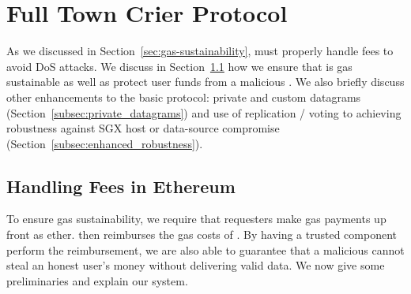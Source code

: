 \section{Full Town Crier Protocol}
\label{sec:enhanced_protocol}

As we discussed in Section~\ref{sec:gas-sustainability}, \tc must properly handle fees to avoid DoS attacks.
We discuss in Section~\ref{sec:gas-protocol} how we ensure that \tc is gas sustainable as well as protect user funds from a malicious \tc.
We also briefly discuss other enhancements to the basic \tc protocol: private and custom datagrams (Section~\ref{subsec:private_datagrams}) and use of replication / voting to achieving robustness against SGX host or data-source compromise (Section~\ref{subsec:enhanced_robustness}).


\subsection{Handling Fees in Ethereum}
\label{sec:gas-protocol}

To ensure gas sustainability, we require that requesters make gas payments up front as ether.
\tcont then reimburses the gas costs of \tc.
By having a trusted component perform the reimbursement, we are also able to guarantee that a malicious \tc cannot steal an honest user's money without delivering valid data.
We now give some preliminaries and explain our system.


